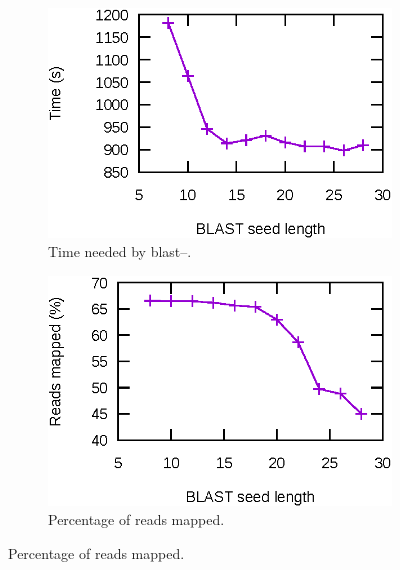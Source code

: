 \begin{figure}
    \begin{subfigure}[b]{0.5\textwidth}
        \includegraphics{img/time}
        \caption{Time needed by \acrshort{blast}--\blastobam{}.}
        \label{fig:time}
    \end{subfigure}
    \hfill
    \begin{subfigure}[b]{0.5\textwidth}
        \includegraphics{img/nbReads}
        \caption{Percentage of reads mapped.}
        \label{fig:nbReads}
    \end{subfigure}
    \smallskip
    

\end{figure}

